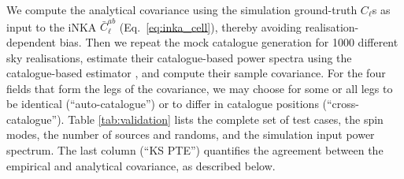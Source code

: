 \documentclass[%
 reprint,
superscriptaddress,
nofootinbib,
 amsmath,amssymb,
 aps,
 prd,
]{revtex4-2}
\begin{document}
    We compute the analytical covariance using the simulation ground-truth $C_\ell$s as input to the iNKA $\bar{C}_\ell^{ab}$ (Eq.~\ref{eq:inka_cell}), thereby avoiding realisation-dependent bias. Then we repeat the mock catalogue generation for 1000 different sky realisations, estimate their catalogue-based power spectra using the catalogue-based estimator \citep{2407.21013}, and compute their sample covariance. For the four fields that form the legs of the covariance, we may choose for some or all legs to be identical (``auto-catalogue'') or to differ in catalogue positions (``cross-catalogue''). Table \ref{tab:validation} lists the complete set of test cases, the spin modes, the number of sources and randoms, and the simulation input power spectrum. The last column (``KS PTE'') quantifies the agreement between the empirical and analytical covariance, as described below.
\end{document}
